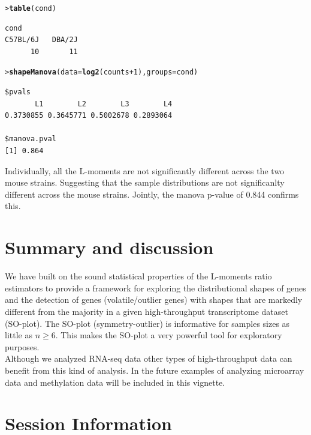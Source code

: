 \documentclass[a4paper, 10pt]{article}\usepackage[]{graphicx}\usepackage[]{color}
\makeatletter
\newcommand{\hlnum}[1]{\textcolor[rgb]{0.686,0.059,0.569}{#1}}%
\newcommand{\hlopt}[1]{\textcolor[rgb]{0,0,0}{#1}}%
\newcommand{\hlstd}[1]{\textcolor[rgb]{0.345,0.345,0.345}{#1}}%
\newcommand{\hlkwc}[1]{\textcolor[rgb]{0.333,0.667,0.333}{#1}}%
\newcommand{\hlkwd}[1]{\textcolor[rgb]{0.737,0.353,0.396}{\textbf{#1}}}%
\newenvironment{kframe}{%
 \def\at@end@of@kframe{}%
 \ifinner\ifhmode%
  \def\at@end@of@kframe{\end{minipage}}%
  \begin{minipage}{\columnwidth}%
 \fi\fi%
 \def\FrameCommand##1{\hskip\@totalleftmargin \hskip-\fboxsep
 \colorbox{shadecolor}{##1}\hskip-\fboxsep
     \hskip-\linewidth \hskip-\@totalleftmargin \hskip\columnwidth}%
 \MakeFramed {\advance\hsize-\width
   \@totalleftmargin\z@ \linewidth\hsize
   \@setminipage}}%
 {\par\unskip\endMakeFramed%
 \at@end@of@kframe}
\newenvironment{knitrout}{}{} %
\makeatother
\begin{document}
\begin{knitrout}\small
{}\color{fgcolor}\begin{kframe}
\begin{alltt}
\hlstd{> }\hlkwd{table}\hlstd{(cond)}
\end{alltt}
\begin{verbatim}
cond
C57BL/6J   DBA/2J 
      10       11 
\end{verbatim}
\begin{alltt}
\hlstd{> }\hlkwd{shapeManova}\hlstd{(}\hlkwc{data}\hlstd{=}\hlkwd{log2}\hlstd{(counts}\hlopt{+}\hlnum{1}\hlstd{),} \hlkwc{groups}\hlstd{=cond)}
\end{alltt}
\begin{verbatim}
$pvals
       L1        L2        L3        L4 
0.3730855 0.3645771 0.5002678 0.2893064 

$manova.pval
[1] 0.864
\end{verbatim}
\end{kframe}
\end{knitrout}
\noindent Individually, all the L-moments are not significantly different across the 
two mouse strains. Suggesting that the sample distributions are not significanlty
different across the mouse strains. Jointly, the manova p-value of 0.844 confirms this.

\section{Summary and discussion}

\noindent We have built on the sound 
statistical properties 
of the L-moments ratio estimators to 
provide a framework
for exploring the distributional shapes of 
genes and the detection of genes 
(volatile/outlier genes) with
shapes that are markedly different 
from the majority in a given
high-throughput
transcriptome dataset (SO-plot).
The SO-plot (symmetry-outlier) is informative 
for samples sizes as little as $n \geq 6$. 
This makes the SO-plot a very powerful tool 
for exploratory purposes.\\

\noindent Although we analyzed RNA-seq data 
other types of high-throughput data can benefit from 
this kind of analysis. In the future examples
of analyzing microarray data and methylation data
will be included in this vignette.

\section{Session Information}
\end{document}
